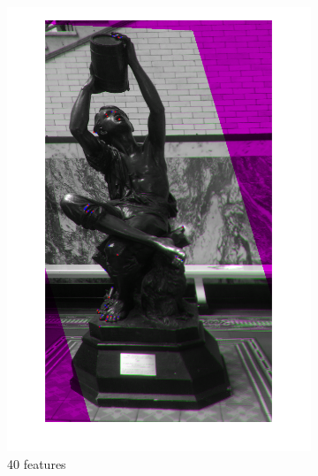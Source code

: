 \documentclass[sigconf]{acmart/acmart}
\begin{document}
\begin{figure}[h]
\begin{subfigure}[b]{0.3\textwidth}
		\includegraphics[width=\textwidth]{figures/alignment/fused_40_features_16_iterations}
		\caption{40 features}
	\end{subfigure}
	\begin{subfigure}[b]{0.3\textwidth}
		\centering

\end{subfigure}
\end{figure}
\end{document}
